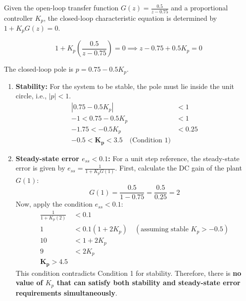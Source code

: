 \documentclass[a4paper,12pt]{article}
\begin{document}
\section{}

Given the open-loop transfer function $G(z) = \frac{0.5}{z - 0.75}$ and a proportional controller $K_p$, the closed-loop characteristic equation is determined by $1 + K_p G(z) = 0$.

\begin{equation}
    1 + K_p \left( \frac{0.5}{z - 0.75} \right) = 0 \implies z - 0.75 + 0.5K_p = 0
\end{equation}

The closed-loop pole is $p = 0.75 - 0.5K_p$.

\begin{enumerate}[label=\alph*.]
    \item \textbf{Stability:}
    For the system to be stable, the pole must lie inside the unit circle, i.e., $|p| < 1$.
    \begin{align*}
        |0.75 - 0.5K_p| &< 1 \\
        -1 < 0.75 - 0.5K_p &< 1 \\
        -1.75 < -0.5K_p &< 0.25 \\
        \mathbf{-0.5 < K_p < 3.5} \quad \text{(Condition 1)}
    \end{align*}

    \item \textbf{Steady-state error $e_{ss} < 0.1$:}
    For a unit step reference, the steady-state error is given by $e_{ss} = \frac{1}{1 + K_p G(1)}$.
    First, calculate the DC gain of the plant $G(1)$:
    \[ G(1) = \frac{0.5}{1 - 0.75} = \frac{0.5}{0.25} = 2 \]
    Now, apply the condition $e_{ss} < 0.1$:
    \begin{align*}
        \frac{1}{1 + K_p(2)} &< 0.1 \\
        1 &< 0.1(1 + 2K_p) \quad (\text{assuming stable } K_p > -0.5) \\
        10 &< 1 + 2K_p \\
        9 &< 2K_p \\
        \mathbf{K_p > 4.5}
    \end{align*}
    This condition contradicts Condition 1 for stability. Therefore, there is \textbf{no value of $K_p$ that can satisfy both stability and steady-state error requirements simultaneously}.


\end{enumerate}
\end{document}
